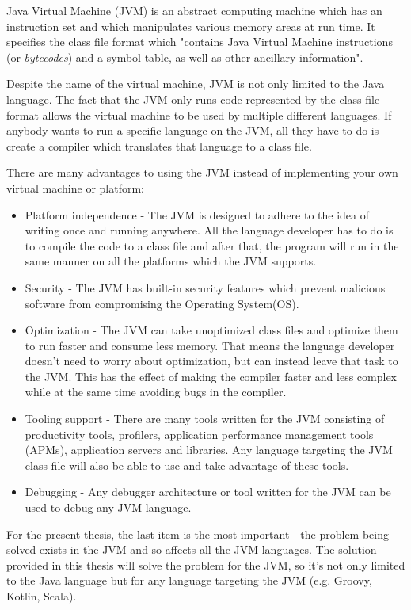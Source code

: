 \documentclass[..thesis.tex]{subfiles}
\begin{document}
Java Virtual Machine (JVM) is an abstract computing machine which has an instruction set and which manipulates various memory areas at run time.\cite{oracle_jvm_spec}
It specifies the class file format which "contains Java Virtual Machine instructions (or \textit{bytecodes}) and a symbol table, as well as other ancillary information"\cite{oracle_jvm_spec}.

Despite the name of the virtual machine, JVM is not only limited to the Java language. 
The fact that the JVM only runs code represented by the class file format allows the virtual machine to be used by multiple different languages.
If anybody wants to run a specific language on the JVM, all they have to do is create a compiler which translates that language to a class file.

There are many advantages to using the JVM instead of implementing your own virtual machine or platform:

\begin{itemize}
  \item Platform independence - 
    The JVM is designed to adhere to the idea of writing once and running anywhere. 
    All the language developer has to do is to compile the code to a class file and after that, the program will run in the same manner on all the platforms which the JVM supports.
  \item Security - 
    The JVM has built-in security features which prevent malicious software from compromising the Operating System(OS). 
  \item Optimization - 
    The JVM can take unoptimized class files and optimize them to run faster and consume less memory. 
    That means the language developer doesn't need to worry about optimization, but can instead leave that task to the JVM.
    This has the effect of making the compiler faster and less complex while at the same time avoiding bugs in the compiler.
  \item Tooling support -
    There are many tools written for the JVM consisting of productivity tools, profilers, application performance management tools (APMs), application servers and libraries. 
    Any language targeting the JVM class file will also be able to use and take advantage of these tools.
  \item Debugging - 
    Any debugger architecture or tool written for the JVM can be used to debug any JVM language.
\end{itemize}

For the present thesis, the last item is the most important - the problem being solved exists in the JVM and so affects all the JVM languages. 
The solution provided in this thesis will solve the problem for the JVM, so it's not only limited to the Java language but for any language targeting the JVM (e.g. Groovy, Kotlin, Scala).
\end{document}

